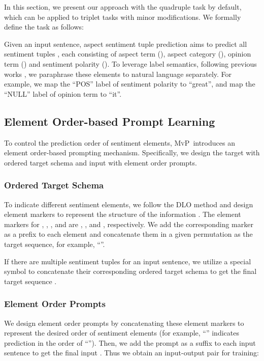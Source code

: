 \documentclass[11pt]{article}
\newcommand\mvp{\textsc{MvP}}
\begin{document}
In this section, we present our approach with the quadruple task by default, which can be applied to triplet tasks with minor modifications. We formally define the task as follows:

Given an input sentence, aspect sentiment tuple prediction aims to predict all sentiment tuples , each consisting of aspect term (), aspect category (), opinion term () and sentiment polarity ().
To leverage label semantics, following previous works \cite{zhang-etal-2021-aspect}, we paraphrase these elements to natural language  separately. For example, we map the ``POS'' label of sentiment polarity  to ``great'', and map the ``NULL'' label of opinion term  to ``it''.








\subsection{Element Order-based Prompt Learning}
\label{subsec:method:order-prompt-learning}

To control the prediction order of sentiment elements, \mvp~introduces an element order-based prompting mechanism. Specifically, we design the target with ordered target schema and input with element order prompts.

\subsubsection{Ordered Target Schema}
\label{subsubsec:method:target-schema}
To indicate different sentiment elements, we follow the DLO method \cite{hu-etal-2022-improving-aspect} and design element markers to represent the structure of the information \cite{DBLP:conf/iclr/PaoliniAKMAASXS21}. The element markers for , , , and  are , ,  and , respectively.
We add the corresponding marker as a prefix to each element and concatenate them in a given permutation  as the target sequence,
for example, ``''.


If there are multiple sentiment tuples for an input sentence, we utilize a special symbol  to concatenate their corresponding ordered target schema to get the final target sequence .

\subsubsection{Element Order Prompts}
\label{subsubsec:method:order-prompt}
We design element order prompts by concatenating these element markers to represent the desired order  of sentiment elements (for example, ``'' indicates prediction in the order of ``''). Then, we add the prompt as a suffix to each input sentence to get the final input . Thus we obtain an input-output pair for training:
\end{document}
